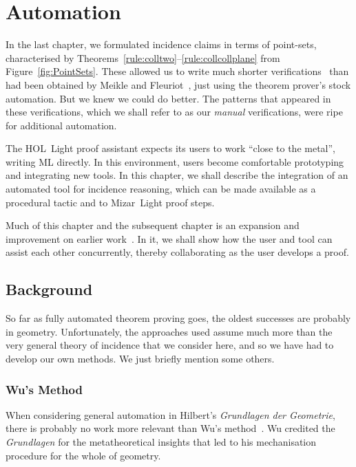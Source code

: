 \chapter{Automation}\label{chapter:Automation}
In the last chapter, we formulated incidence claims in terms of point-sets, characterised by Theorems~\ref{rule:colltwo}--\ref{rule:collcollplane} from Figure~\ref{fig:PointSets}. These allowed us to write much shorter verifications~\cite{ScottMScThesis} than had been obtained by Meikle and Fleuriot~\cite{MeikleFleuriotFormalizingHilbert}, just using the theorem prover's stock automation. But we knew we could do better. The patterns that appeared in these verifications, which we shall refer to as our \emph{manual} verifications, were ripe for additional automation.

The HOL~Light proof assistant expects its users to work ``close to the metal'', writing ML directly. In this environment, users become comfortable prototyping and  integrating new tools. In this chapter, we shall describe the integration of an automated tool for incidence reasoning, which can be made available as a procedural tactic and to Mizar~Light proof steps.

Much of this chapter and the subsequent chapter is an expansion and improvement on earlier work~\cite{ScottExploring,ScottComposable,ScottCombinator}. In it, we shall show how the user and tool can assist each other concurrently, thereby collaborating as the user develops a proof.

\section{Background}
So far as fully automated theorem proving goes, the oldest successes are probably in geometry. Unfortunately, the approaches used assume much more than the very general theory of incidence that we consider here, and so we have had to develop our own methods. We just briefly mention some others.

\subsection{Wu's Method}
When considering general automation in Hilbert's \emph{Grundlagen der Geometrie}, there is probably no work more relevant than Wu's method~\cite{WuMechanicalTheoremProving}. Wu credited the \emph{Grundlagen} for the metatheoretical insights that led to his mechanisation procedure for the whole of geometry.

